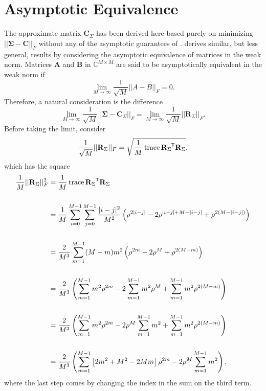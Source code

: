 \documentclass[letterpaper,12pt,oneside,final]{article}
\newcommand{\m}[1]{\mathbf{#1}}               %
\newcommand{\sm}[1]{\boldsymbol{#1}}   %
\newcommand{\tr}[1]{{#1}^{\mkern-1.5mu\mathsf{T}}}              %
\newcommand{\norm}[1]{||{#1}||}              %
\newcommand{\frob}[1]{\norm{#1}_F}
\newcommand{\abs}[1]{\lvert{#1}\rvert}              %
\newcommand*{\trace}{\operatorname{trace}}
\newcommand{\field}[1]{\mathbb{#1}}
\newcommand{\Complex}{\field{C}}
\begin{document}
\section{Asymptotic Equivalence} \label{c:multipleTesting:asympEquiv}

The approximate matrix $\m{C}_{\Sigma}$ has been derived here based purely on minimizing $\frob{\sm{\Sigma} - \m{C}}$ without any of the asymptotic guarantees of \cite{grenanderszego1958}. \cite{gray2006toeplitz} derives similar, but less general, results by considering the asymptotic equivalence of matrices in the weak norm. Matrices $\m{A}$ and $\m{B}$ in $\Complex^{M \times M}$ are said to be asymptotically equivalent in the weak norm if
$$\lim_{M \rightarrow \infty} \frac{1}{\sqrt{M}} \frob{A - B} = 0.$$
Therefore, a natural consideration is the difference
\begin{equation} \label{eq:multipleTesting:asympEq}
  \lim_{M \rightarrow \infty} \frac{1}{\sqrt{M}} \frob{\sm{\Sigma} - \m{C}_{\Sigma}} = \lim_{M \rightarrow \infty} \frac{1}{\sqrt{M}} \frob{\m{R}_{\Sigma}}.
\end{equation}
Before taking the limit, consider
$$\frac{1}{\sqrt{M}} \frob{\m{R}_{\Sigma}} =  \sqrt{ \frac{1}{M} \trace{\tr{\m{R}_{\Sigma}} \m{R}_{\Sigma}} },$$
which has the square
\begin{equation} \label{eq:multipleTesting:asymTrace}
  \begin{aligned}
    \frac{1}{M} \frob{\m{R}_{\Sigma}}^2 & =  \frac{1}{M} \trace{\tr{\m{R}_{\Sigma}} \m{R}_{\Sigma}} \\
    & \\
    & = \frac{1}{M} \sum_{i = 0}^{M-1} \sum_{j = 0}^{M-1} \frac{\abs{i-j}^2}{M^2} \left ( \rho^{2\abs{i-j}} - 2 \rho^{\abs{i-j} + M - \abs{i-j}} + \rho^{2(M - \abs{i-j})} \right ) \\
    & \\
    & =  \frac{2}{M^3} \sum_{m = 1}^{M-1} (M-m) m^2 \left ( \rho^{2m} - 2 \rho^{M} + \rho^{2(M - m)} \right ) \\
    & \\
    & =  \frac{2}{M^3} \left ( \sum_{m = 1}^{M-1} m^2 \rho^{2m} - 2 \sum_{m = 1}^{M-1} m^2 \rho^M + \sum_{m = 1}^{M-1} m^2 \rho^{2(M-m)} \right ) \\
    & \\
    & = \frac{2}{M^3} \left ( \sum_{m = 1}^{M-1} m^2 \rho^{2m} - 2\rho^M \sum_{m = 1}^{M-1} m^2 + \sum_{m = 1}^{M-1} m^2 \rho^{2(M-m)} \right ) \\
    & \\
    & =  \frac{2}{M^3} \left ( \sum_{m = 1}^{M-1} \left [ 2m^2 + M^2 - 2Mm \right ] \rho^{2m} -  2 \rho^M \sum_{m = 1}^{M-1} m^2 \right ),
  \end{aligned}
\end{equation}
where the last step comes by changing the index in the sum on the third term.
\end{document}
